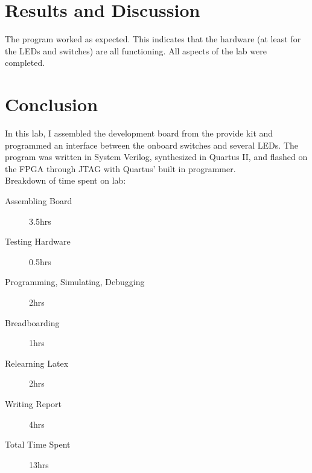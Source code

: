 \documentclass[11pt]{article}
\begin{document}
\clearpage

\section{Results and Discussion}

The program worked as expected. This indicates that the hardware (at least for the LEDs and switches) are all functioning. All aspects of the lab were completed. 



\section{Conclusion}

In this lab, I assembled the development board from the provide kit and programmed an interface between the onboard switches and several LEDs. The program was written in System Verilog, synthesized in Quartus II, and flashed on the FPGA through JTAG with Quartus' built in programmer. \\

Breakdown of time spent on lab:
\begin{description}
	\item[Assembling Board] 3.5hrs
	\item[Testing Hardware] 0.5hrs
	\item[Programming, Simulating, Debugging] 2hrs
	\item[Breadboarding] 1hrs
	\item[Relearning Latex] 2hrs
	\item[Writing Report] 4hrs
	\item[Total Time Spent] 13hrs
\end{description}
\end{document}
